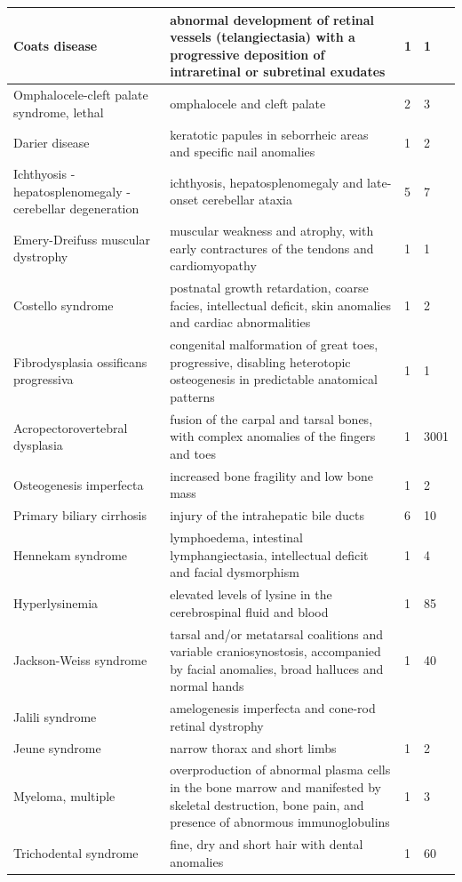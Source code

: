 \documentclass[10pt,letterpaper,final]{article}
\begin{document}
\begin{center}
\begin{small}
\begin{longtable}{|p{3.5cm}|p{4.5cm}|p{1.8cm}|p{1.8cm}|}
    Coats disease & abnormal development of retinal vessels (telangiectasia) with a progressive deposition of intraretinal or subretinal exudates & 1 & 1\\    \hline
    Omphalocele-cleft palate syndrome, lethal & omphalocele and cleft palate & 2 & 3\\    \hline
    Darier disease & keratotic papules in seborrheic areas and specific nail anomalies & 1 & 2\\    \hline
    Ichthyosis - hepatosplenomegaly - cerebellar degeneration & ichthyosis, hepatosplenomegaly and late-onset cerebellar ataxia & 5 & 7\\    \hline
    Emery-Dreifuss muscular dystrophy & muscular weakness and atrophy, with early contractures of the tendons and cardiomyopathy & 1 & 1\\    \hline
    Costello syndrome & postnatal growth retardation, coarse facies, intellectual deficit, skin anomalies and cardiac abnormalities & 1 & 2\\    \hline
    Fibrodysplasia ossificans progressiva & congenital malformation of great toes, progressive, disabling heterotopic osteogenesis in predictable anatomical patterns & 1 & 1\\    \hline
    Acropectorovertebral dysplasia & fusion of the carpal and tarsal bones, with complex anomalies of the fingers and toes & 1 & 3001\\    \hline
    Osteogenesis imperfecta & increased bone fragility and low bone mass & 1 & 2\\    \hline
    Primary biliary cirrhosis & injury of the intrahepatic bile ducts & 6 & 10\\    \hline
    Hennekam syndrome & lymphoedema, intestinal lymphangiectasia, intellectual deficit and facial dysmorphism & 1 & 4\\    \hline
    Hyperlysinemia & elevated levels of lysine in the cerebrospinal fluid and blood & 1 & 85\\    \hline
    Jackson-Weiss syndrome & tarsal and/or metatarsal coalitions and variable craniosynostosis, accompanied by facial anomalies, broad halluces and normal hands & 1 & 40\\    \hline
    Jalili syndrome & amelogenesis imperfecta and cone-rod retinal dystrophy &  & \\    \hline
    Jeune syndrome & narrow thorax and short limbs & 1 & 2\\    \hline
    Myeloma, multiple & overproduction of abnormal plasma cells in the bone marrow and manifested by skeletal destruction, bone pain, and presence of abnormous immunoglobulins & 1 & 3\\    \hline
    Trichodental syndrome & fine, dry and short hair with dental anomalies & 1 & 60\\    \hline
    \end{longtable}
\end{small}
\end{center}
\end{document}

